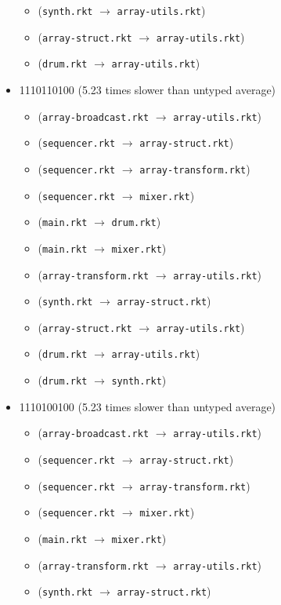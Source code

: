 \documentclass{article}
\newcommand{\mono}[1]{\texttt{#1}}
\begin{document}
\begin{itemize}
\begin{itemize}
  \item (\mono{synth.rkt} $\rightarrow$ \mono{array-utils.rkt})
  \item (\mono{array-struct.rkt} $\rightarrow$ \mono{array-utils.rkt})
  \item (\mono{drum.rkt} $\rightarrow$ \mono{array-utils.rkt})
  \end{itemize}
\item 1110110100 (5.23 times slower than untyped average)
  \begin{itemize}
  \item (\mono{array-broadcast.rkt} $\rightarrow$ \mono{array-utils.rkt})
  \item (\mono{sequencer.rkt} $\rightarrow$ \mono{array-struct.rkt})
  \item (\mono{sequencer.rkt} $\rightarrow$ \mono{array-transform.rkt})
  \item (\mono{sequencer.rkt} $\rightarrow$ \mono{mixer.rkt})
  \item (\mono{main.rkt} $\rightarrow$ \mono{drum.rkt})
  \item (\mono{main.rkt} $\rightarrow$ \mono{mixer.rkt})
  \item (\mono{array-transform.rkt} $\rightarrow$ \mono{array-utils.rkt})
  \item (\mono{synth.rkt} $\rightarrow$ \mono{array-struct.rkt})
  \item (\mono{array-struct.rkt} $\rightarrow$ \mono{array-utils.rkt})
  \item (\mono{drum.rkt} $\rightarrow$ \mono{array-utils.rkt})
  \item (\mono{drum.rkt} $\rightarrow$ \mono{synth.rkt})
  \end{itemize}
\item 1110100100 (5.23 times slower than untyped average)
  \begin{itemize}
  \item (\mono{array-broadcast.rkt} $\rightarrow$ \mono{array-utils.rkt})
  \item (\mono{sequencer.rkt} $\rightarrow$ \mono{array-struct.rkt})
  \item (\mono{sequencer.rkt} $\rightarrow$ \mono{array-transform.rkt})
  \item (\mono{sequencer.rkt} $\rightarrow$ \mono{mixer.rkt})
  \item (\mono{main.rkt} $\rightarrow$ \mono{mixer.rkt})
  \item (\mono{array-transform.rkt} $\rightarrow$ \mono{array-utils.rkt})
  \item (\mono{synth.rkt} $\rightarrow$ \mono{array-struct.rkt})

\end{itemize}
\end{itemize}
\end{document}
